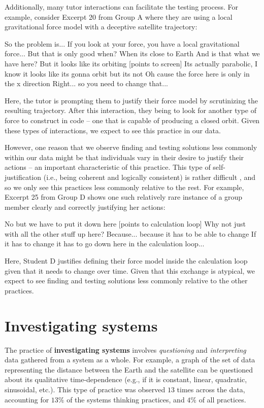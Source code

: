 \documentclass{msuphddissertation}
\begin{document}
\begin{doublespace}
\begin{appendices}
Additionally, many tutor interactions can facilitate the testing process.  For example, consider Excerpt 20 from Group A where they are using a local gravitational force model with a deceptive satellite trajectory: \begin{description}
\TA So the problem is...
\TA If you look at your force, you have a local gravitational force...
\TA But that is only good when?
\SB When its close to Earth
\TA And is that what we have here?
\SA But it looks like its orbiting [points to screen]
\TA Its actually parabolic, I know it looks like its gonna orbit but its not
\SB Oh cause the force here is only in the x direction
\TA Right... so you need to change that...
\end{description}  Here, the tutor is prompting them to justify their force model by scrutinizing the resulting trajectory.  After this interaction, they being to look for another type of force to construct in code -- one that is capable of producing a closed orbit.  Given these types of interactions, we expect to see this practice in our data.

However, one reason that we observe finding and testing solutions less commonly within our data might be that individuals vary in their desire to justify their actions -- an important characteristic of this practice.  This type of self-justification (i.e., being coherent and logically consistent) is rather difficult \cite{Tamir2007,Weber2005}, and so we only see this practices less commonly relative to the rest.  For example, Excerpt 25 from Group D shows one such relatively rare instance of a group member clearly and correctly justifying her actions: \begin{description}
\SD No but we have to put it down here [points to calculation loop]
\SA Why not just with all the other stuff {up here}?
\SD Because... because it has to be able to change
\SD If it has to change it has to go down here {in the calculation loop}...
\end{description}  Here, Student D justifies defining their force model inside the calculation loop given that it needs to change over time.  Given that this exchange is atypical, we expect to see finding and testing solutions less commonly relative to the other practices.

\section*{Investigating systems}

The practice of \textbf{investigating systems} involves \textit{questioning} and \textit{interpreting} data gathered from a system as a whole.  For example, a graph of the set of data representing the distance between the Earth and the satellite can be questioned about its qualitative time-dependence (e.g., if it is constant, linear, quadratic, sinusoidal, etc.).  This type of practice was observed $13$ times across the data, accounting for $13\%$ of the systems thinking practices, and $4\%$ of all practices.


\end{appendices}
\end{doublespace}
\end{document}
